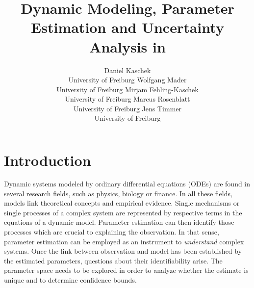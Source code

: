 \documentclass[article]{jss}
\author{Daniel Kaschek\\University of Freiburg \And
	Wolfgang Mader\\University of Freiburg \AND
	Mirjam Fehling-Kaschek\\University of Freiburg \And
	Marcus Rosenblatt\\University of Freiburg \And
	Jens Timmer\\University of Freiburg}
\title{Dynamic Modeling, Parameter Estimation and Uncertainty Analysis in \proglang{R}}
\begin{document}
\section{Introduction}
Dynamic systems modeled by ordinary differential equations (ODEs) are found in several research fields, such as physics, biology or finance. In all these fields, models link theoretical concepts and empirical evidence.
Single mechanisms or single processes of a complex system are represented by respective terms in the equations of a dynamic model. Parameter estimation can then identify those processes which are crucial to explaining the observation.
In that sense, parameter estimation can be employed as an instrument to \textit{understand} complex systems. Once the link between observation and model has been established by the estimated parameters, questions about their identifiability arise. The parameter space needs to be explored in order to analyze whether the estimate is unique and to determine confidence bounds.
\end{document}
